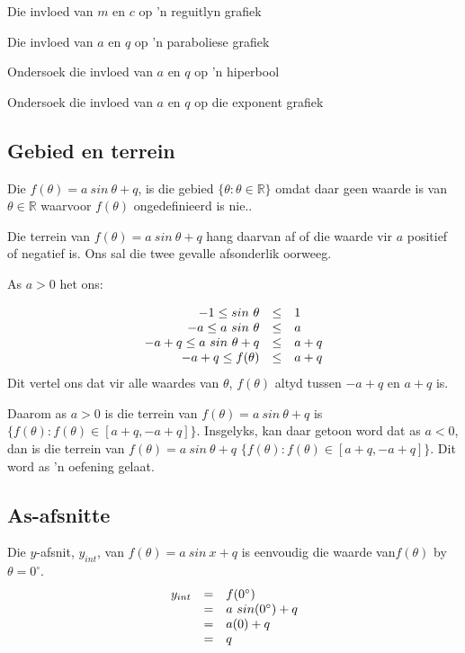 \begin{Ondersoek}{Die invloed van $m$ en $c$ op 'n reguitlyn grafiek}
\begin{Ondersoek}{Die invloed van $a$ en $q$ op 'n paraboliese grafiek}
\begin{Ondersoek}{Ondersoek die invloed van $a$ en $q$ op 'n hiperbool}
\begin{Ondersoek}{Ondersoek die invloed van $a$ en $q$ op die exponent grafiek}
\subsection*{Gebied en terrein}
\nopagebreak
Die $f(\theta )=a~sin~\theta +q$, is die gebied $\{\theta :\theta \in \mathbb{R}\}$  omdat daar geen waarde is van $\theta \in \mathbb{R}$ waarvoor $f(\theta )$ ongedefinieerd is nie..\par 
Die terrein van $f(\theta )=a~sin~\theta +q$ hang daarvan af of die waarde vir $a$ positief of negatief is. Ons sal die twee
gevalle afsonderlik oorweeg.\par 
As $a>0$ het ons:\par 
\nopagebreak\noindent{}
\begin{equation*}
\begin{array}{ccc}\hfill -1\leq sin~\theta & \leq & 1\hfill \\ \hfill -a\leq a~sin~\theta & \leq & a\hfill \\ \hfill -a+q\leq a~sin~\theta +q& \leq & a+q\hfill \\ \hfill -a+q\leq f(\theta )& \leq & a+q\hfill \end{array}
\end{equation*}
Dit vertel ons dat vir alle waardes van $\theta $, $f(\theta )$ altyd tussen $-a+q$ en $a+q$ is.\par
Daarom as $a>0$ is die terrein van  $f(\theta )=a~sin~\theta +q$ is $\{f(\theta ):f(\theta )\in [a+q,-a+q]\}$.
Insgelyks, kan daar getoon word dat as $a<0$, dan is die terrein van $f(\theta )=a~sin~\theta +q$ $\{f(\theta ):f(\theta )\in [a+q,-a+q]\}$. Dit word as ’n oefening gelaat.\par 



\subsection*{As-afsnitte}
\nopagebreak
Die $y$-afsnit, ${y}_{int}$, van $f(\theta )=a~sin~x+q$ is eenvoudig die waarde van$f(\theta )$ by $\theta ={0}^{\circ }$.
\begin{equation*}
\begin{array}{ccc}
  \hfill {y}_{int}& =& f({0}^{\circ })\hfill \\
 & =& a~sin({0}^{\circ })+q\hfill \\
 & =& a(0)+q\hfill \\
 & =& q\hfill 
\end{array}
\end{equation*}




\end{Ondersoek}
\end{Ondersoek}
\end{Ondersoek}
\end{Ondersoek}
